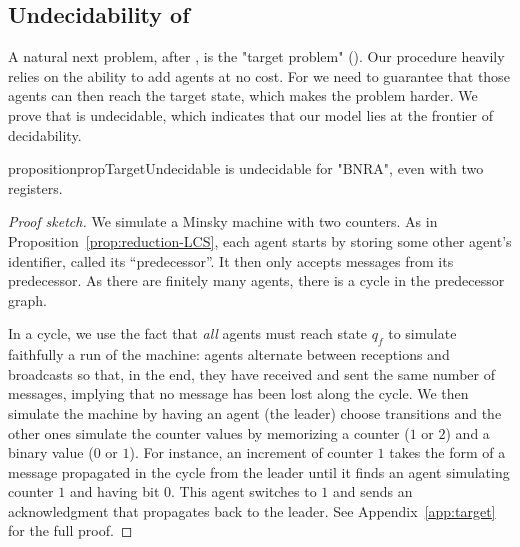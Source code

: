 \subsection{Undecidability of \TARGET}
\label{sec:undec-target}

A natural next problem, after \COVER, is the "target problem" (\TARGET).  
Our \COVER procedure heavily relies on the ability to add agents at no cost. For \TARGET we need to guarantee that those agents can then reach the target state, which makes the problem harder. 
We prove that \TARGET is undecidable, which indicates that our model lies at the frontier of decidability.

\begin{restatable}{proposition}{propTargetUndecidable}
\label{prop:target-undec}
\TARGET is undecidable for "BNRA", even with two registers.
\end{restatable}

\begin{proof}[Proof sketch]
We simulate a Minsky machine with two counters. As in Proposition~\ref{prop:reduction-LCS},  each agent starts by storing some other agent's identifier, called its ``predecessor''. It then only accepts messages from its predecessor. As there are finitely many agents, there is a cycle in the predecessor graph. 

In a cycle, we use the fact that \emph{all} agents must reach state $q_f$ to simulate faithfully a run of the machine: agents alternate between receptions and broadcasts so that, in the end, they have received and sent the same number of messages, implying that no message has been lost along the cycle.
We then simulate the machine by having an agent (the leader) choose transitions and the other ones simulate the counter values by memorizing a counter ($1$ or $2$) and a binary value ($0$ or $1$). For instance, an increment of counter $1$ takes the form of a message propagated in the cycle from the leader until it finds an agent simulating counter $1$ and having bit $0$. This agent switches to $1$ and sends an acknowledgment that propagates back to the leader. See Appendix~\ref{app:target} for the full proof. 
\end{proof}
